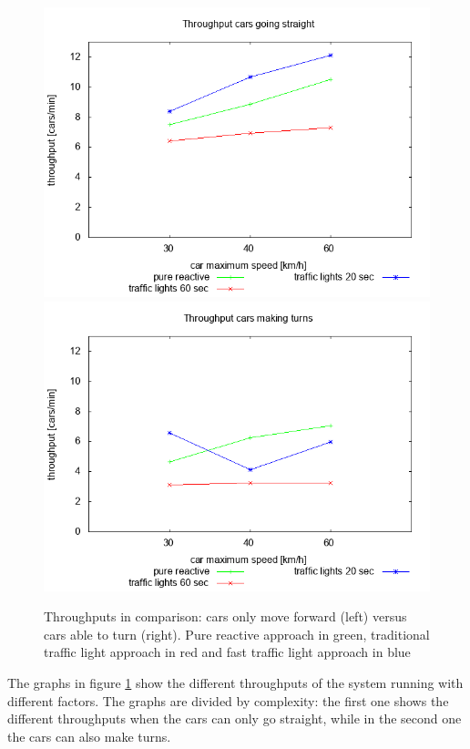 \begin{figure}
\centering
\includegraphics[scale=0.35]{img/plot_throughstraight}
\includegraphics[scale=0.35]{img/plot_throughturns}
\caption{Throughputs in comparison: cars only move forward (left) versus cars able to turn (right). Pure reactive approach in green, traditional traffic light approach in red and fast traffic light approach in blue}
\label{fig:throughput}
\end{figure}

The graphs in figure \ref{fig:throughput} show the different throughputs of the system running with different factors.
The graphs are divided by complexity: the first one shows the different throughputs when the cars can only go straight, while in the second one the cars can also make turns.\\

